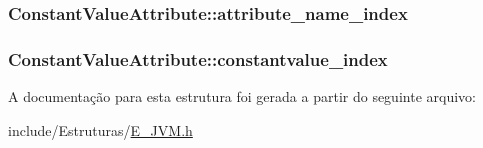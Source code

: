 \subsubsection[{attribute\+\_\+name\+\_\+index}]{ Constant\+Value\+Attribute\+::attribute\+\_\+name\+\_\+index}\label{struct_constant_value_attribute_a29106b223531e4e2178ab37b7653c758}
\hypertarget{struct_constant_value_attribute_acc45997fb7ce815924e042fec885525e}{}
\subsubsection[{constantvalue\+\_\+index}]{ Constant\+Value\+Attribute\+::constantvalue\+\_\+index}\label{struct_constant_value_attribute_acc45997fb7ce815924e042fec885525e}


A documentação para esta estrutura foi gerada a partir do seguinte arquivo\+:\begin{DoxyCompactItemize}
\item 
include/\+Estruturas/\hyperlink{_e___j_v_m_8h}{E\+\_\+\+J\+V\+M.\+h}\end{DoxyCompactItemize}

